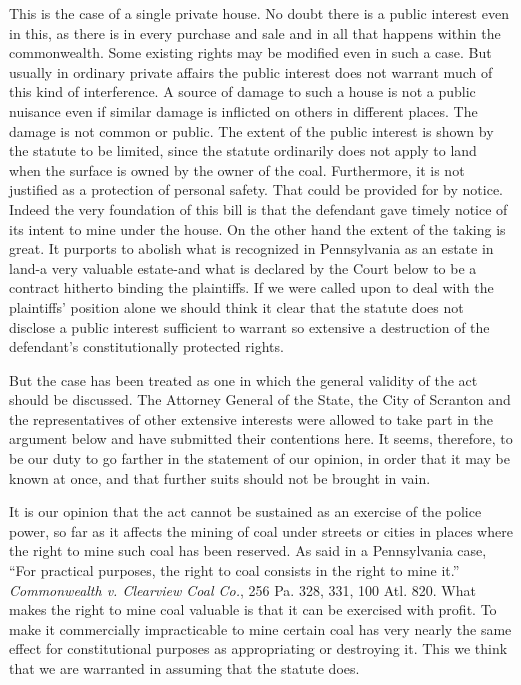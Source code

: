 This is the case of a single private house. No doubt there is a public interest
even in this, as there is in every purchase and sale and in all that happens
within the commonwealth. Some existing rights may be modified even in such a
case. But usually in ordinary private affairs the public interest does not
warrant much of this kind of interference. A source of damage to such a house is
not a public nuisance even if similar damage is inflicted on others in different
places. The damage is not common or public. The extent of the public interest is
shown by the statute to be limited, since the statute ordinarily does not apply
to land when the surface is owned by the owner of the coal. Furthermore, it is
not justified as a protection of personal safety. That could be provided for by
notice. Indeed the very foundation of this bill is that the defendant gave
timely notice of its intent to mine under the house. On the other hand the
extent of the taking is great. It purports to abolish what is recognized in
Pennsylvania as an estate in land-a very valuable estate-and what is declared by
the Court below to be a contract hitherto binding the plaintiffs. If we were
called upon to deal with the plaintiffs' position alone we should think it clear
that the statute does not disclose a public interest sufficient to warrant so
extensive a destruction of the defendant's constitutionally protected rights.

But the case has been treated as one in which the general validity of the act
should be discussed. The Attorney General of the State, the City of Scranton and
the representatives of other extensive interests were allowed to take part in
the argument below and have submitted their contentions here. It seems,
therefore, to be our duty to go farther in the statement of our opinion, in
order that it may be known at once, and that further suits should not be brought
in vain.

It is our opinion that the act cannot be sustained as an exercise of the police
power, so far as it affects the mining of coal under streets or cities in places
where the right to mine such coal has been reserved. As said in a Pennsylvania
case, ``For practical purposes, the right to coal consists in the right to mine
it.'' \emph{Commonwealth v. Clearview Coal Co.}, 256 Pa. 328, 331, 100 Atl. 820.
What makes the right to mine coal valuable is that it can be exercised with
profit. To make it commercially impracticable to mine certain coal has very
nearly the same effect for constitutional purposes as appropriating or
destroying it. This we think that we are warranted in assuming that the statute
does.


